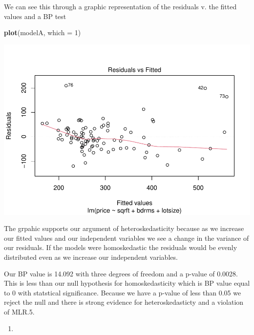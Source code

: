 \documentclass[
  12pt,
  landscape]{article}
\newenvironment{Shaded}{\begin{snugshade}}{\end{snugshade}}
\newcommand{\DataTypeTok}[1]{\textcolor[rgb]{0.13,0.29,0.53}{#1}}
\newcommand{\DecValTok}[1]{\textcolor[rgb]{0.00,0.00,0.81}{#1}}
\newcommand{\KeywordTok}[1]{\textcolor[rgb]{0.13,0.29,0.53}{\textbf{#1}}}
\newcommand{\NormalTok}[1]{#1}
\begin{document}
We can see this through a graphic representation of the residuals v. the
fitted values and a BP test

\begin{Shaded}
\begin{Highlighting}[]
\KeywordTok{plot}\NormalTok{(modelA, }\DataTypeTok{which =} \DecValTok{1}\NormalTok{)}
\end{Highlighting}
\end{Shaded}

\includegraphics{Ogle_MicroMetricsAssignment_2_Q2_files/figure-latex/unnamed-chunk-8-1.pdf}

The grpahic supports our argument of heteroskedasticity because as we
increase our fitted values and our independent variables we see a change
in the variance of our residuals. If the models were homoskedastic the
residuals would be evenly distributed even as we increase our
independent variables.

Our BP value is 14.092 with three degrees of freedom and a p-value of
0.0028. This is less than our null hypothesis for homoskedasticity which
is BP value equal to 0 with statstical significance. Because we have a
p-value of less than 0.05 we reject the null and there is strong
evidence for heteroskedasticty and a violation of MLR.5.

\begin{enumerate}
\def\labelenumi{(\roman{enumi})}
\item
\end{enumerate}
\end{document}

